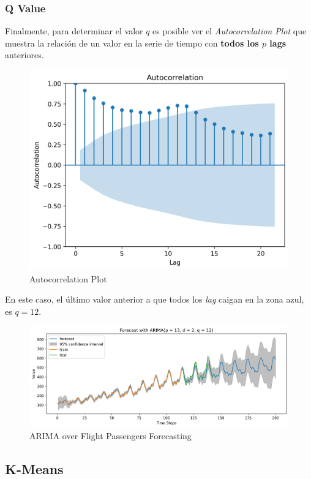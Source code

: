 \subsubsection{Q Value}
Finalmente, para determinar el valor $q$ es posible ver el \textit{Autocorrelation Plot} que muestra la relación de un valor en la serie de tiempo con \textbf{todos los $p$ lags} anteriores. 
\begin{figure}[H]
    \center
    \includegraphics[scale=0.5]{notebooks/ML/img/autocorrelation.png}
    \caption{Autocorrelation Plot}
\end{figure}
En este caso, el último valor anterior a que todos los \textit{lag} caigan en la zona azul, es $q=12$.
\begin{figure}[H]
    \center
    \includegraphics[scale=0.5]{notebooks/ML/img/arima_results.png}
    \caption{ARIMA over Flight Passengers Forecasting}
\end{figure}

\subsection{K-Means}

